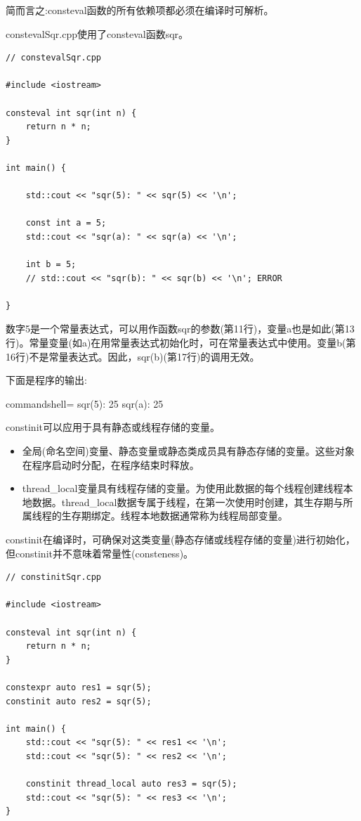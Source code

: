 简而言之:consteval函数的所有依赖项都必须在编译时可解析。

constevalSqr.cpp使用了consteval函数sqr。

\begin{lstlisting}[style=styleCXX]
// constevalSqr.cpp

#include <iostream>

consteval int sqr(int n) {
	return n * n;
}

int main() {

	std::cout << "sqr(5): " << sqr(5) << '\n';
	
	const int a = 5;
	std::cout << "sqr(a): " << sqr(a) << '\n';
	
	int b = 5;
	// std::cout << "sqr(b): " << sqr(b) << '\n'; ERROR

}
\end{lstlisting}

数字5是一个常量表达式，可以用作函数sqr的参数(第11行)，变量a也是如此(第13行)。常量变量(如a)在用常量表达式初始化时，可在常量表达式中使用。变量b(第16行)不是常量表达式。因此，sqr(b)(第17行)的调用无效。

下面是程序的输出:

\begin{tcblisting}{commandshell={}}
sqr(5): 25
sqr(a): 25
\end{tcblisting}


constinit可以应用于具有静态或线程存储的变量。

\begin{itemize}
\item 
全局(命名空间)变量、静态变量或静态类成员具有静态存储的变量。这些对象在程序启动时分配，在程序结束时释放。

\item 
thread\_local变量具有线程存储的变量。为使用此数据的每个线程创建线程本地数据。thread\_local数据专属于线程，在第一次使用时创建，其生存期与所属线程的生存期绑定。线程本地数据通常称为线程局部变量。
\end{itemize}

constinit在编译时，可确保对这类变量(静态存储或线程存储的变量)进行初始化，但constinit并不意味着常量性(consteness)。

\begin{lstlisting}[style=styleCXX]
// constinitSqr.cpp

#include <iostream>

consteval int sqr(int n) {
	return n * n;
}

constexpr auto res1 = sqr(5);
constinit auto res2 = sqr(5);

int main() {
	std::cout << "sqr(5): " << res1 << '\n';
	std::cout << "sqr(5): " << res2 << '\n';
	
	constinit thread_local auto res3 = sqr(5);
	std::cout << "sqr(5): " << res3 << '\n';
}
\end{lstlisting}

